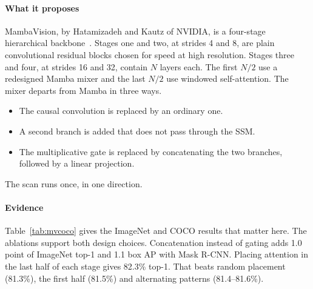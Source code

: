 \paragraph{What it proposes}
MambaVision, by Hatamizadeh and Kautz of NVIDIA, is a four-stage
hierarchical backbone~\citep{hatamizadeh2025mambavision}. Stages one and two,
at strides 4 and 8, are plain convolutional residual blocks chosen for speed
at high resolution. Stages three and four, at strides 16 and 32, contain $N$
layers each. The first $N/2$ use a redesigned Mamba mixer and the last $N/2$
use windowed self-attention. The mixer departs from Mamba in three ways.
\begin{itemize}
  \item The causal convolution is replaced by an ordinary one.
  \item A second branch is added that does not pass through the SSM.
  \item The multiplicative gate is replaced by concatenating the two
        branches, followed by a linear projection.
\end{itemize}
The scan runs once, in one direction.

\paragraph{Evidence}
Table~\ref{tab:mvcoco} gives the ImageNet and COCO results that matter here.
The ablations support both design choices. Concatenation instead of gating
adds 1.0 point of ImageNet top-1 and 1.1 box AP with Mask R-CNN. Placing
attention in the last half of each stage gives 82.3\% top-1. That beats
random placement (81.3\%), the first half (81.5\%) and alternating patterns
(81.4--81.6\%).

